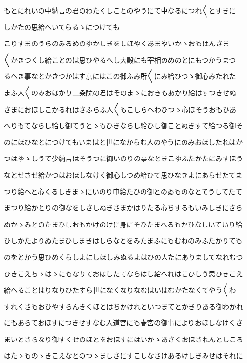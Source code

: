 \documentclass[a4paper,11pt,landscape]{ltjtarticle}
\begin{document}
もとにれいの中納言の君のわたくしことのやうにて中なるにつれ〱とすきに
\par\medskip
しかたの思給へいてらるゝにつけても
\par\medskip
こりすまのうらのみるめのゆかしきをしほやくあまやいかゝおもはんさま
\par\medskip
〱かきつくし給ことのは思ひやるへし大殿にも宰相のめのとにもつかうまつ
\par\medskip
るへき事なとかきつかはす京にはこの御ふみ所〱にみ給ひつゝ御心みたれた
\par\medskip
まふ人〱のみおほかり二条院の君はそのまゝにおきもあかり給はすつきせぬ
\par\medskip
さまにおほしこかるれはさふらふ人〱もこしらへわひつゝ心ほそうおもひあ
\par\medskip
へりもてならし給し御てうとゝもひきならし給ひし御ことぬきすて給つる御そ
\par\medskip
のにほひなとにつけてもいまはと世になからむ人のやうにのみおほしたれはか
\par\medskip
つはゆゝしうて少納言はそうつに御いのりの事なときこゆふたかたにみすほう
\par\medskip
なとせさせ給かつはおほしなけく御心しつめ給ひて思ひなきよにあらせたてま
\par\medskip
つり給へと心くるしきまゝにいのり申給たひの御とのゐものなとてうしてたて
\par\medskip
まつり給かとりの御なをしさしぬきさまかはりたる心ちするもいみしきにさら
\par\medskip
ぬかゝみとのたまひしおもかけのけに身にそひたまへるもかひなしいていり給
\par\medskip
ひしかたよりゐたまひしまきはしらなとをみたまふにもむねのみふたかりても
\par\medskip
のをとかう思ひめくらしよにしほしみぬるよはひの人たにありましてなれむつ
\par\medskip
ひきこえちゝはゝにもなりておほしたてならはし給へれはこひしう思ひきこえ
\par\medskip
給へることはりなりひたすら世になくなりなむはいはむかたなくてやう〱わ
\par\medskip
すれくさもおひやすらんきくほとはちかけれといつまてとかきりある御わかれ
\par\medskip
にもあらておほすにつきせすなむ入道宮にも春宮の御事によりおほしなけくさ
\par\medskip
まいとさらなり御すくせのほとをおほすにはいかゝあさくおほされんとしころ
\par\medskip
はたゝものゝきこえなとのつゝましさにすこしなさけあるけしきみせはそれに
\end{document}
